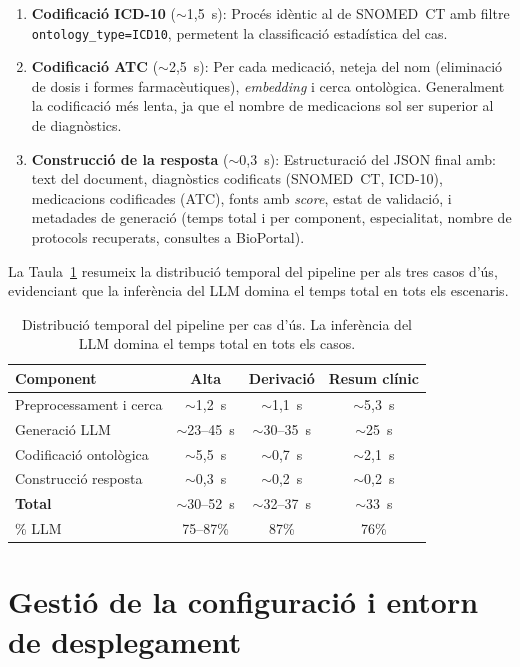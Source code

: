 \documentclass[CAT]{TFUOC}%
\begin{document}
\begin{enumerate}
    \item \textbf{Codificació ICD-10} ($\sim$1,5~s): Procés idèntic al de SNOMED~CT amb filtre \texttt{ontology\_type=ICD10}, permetent la classificació estadística del cas.

    \item \textbf{Codificació ATC} ($\sim$2,5~s): Per cada medicació, neteja del nom (eliminació de dosis i formes farmacèutiques), \textit{embedding} i cerca ontològica. Generalment la codificació més lenta, ja que el nombre de medicacions sol ser superior al de diagnòstics.

    \item \textbf{Construcció de la resposta} ($\sim$0,3~s): Estructuració del JSON final amb: text del document, diagnòstics codificats (SNOMED~CT, ICD-10), medicacions codificades (ATC), fonts amb \textit{score}, estat de validació, i metadades de generació (temps total i per component, especialitat, nombre de protocols recuperats, consultes a BioPortal).
\end{enumerate}

La Taula~\ref{tab:pipeline-timing} resumeix la distribució temporal del pipeline per als tres casos d'ús, evidenciant que la inferència del LLM domina el temps total en tots els escenaris.

\begin{table}[H]
\centering
\small
\begin{tabular}{lccc}
\hline
\textbf{Component} & \textbf{Alta} & \textbf{Derivació} & \textbf{Resum clínic} \\
\hline
Preprocessament i cerca & $\sim$1,2~s & $\sim$1,1~s & $\sim$5,3~s \\
Generació LLM & $\sim$23--45~s & $\sim$30--35~s & $\sim$25~s \\
Codificació ontològica & $\sim$5,5~s & $\sim$0,7~s & $\sim$2,1~s \\
Construcció resposta & $\sim$0,3~s & $\sim$0,2~s & $\sim$0,2~s \\
\hline
\textbf{Total} & $\sim$30--52~s & $\sim$32--37~s & $\sim$33~s \\
\% LLM & 75--87\% & 87\% & 76\% \\
\hline
\end{tabular}
\caption{Distribució temporal del pipeline per cas d'ús. La inferència del LLM domina el temps total en tots els casos.}
\label{tab:pipeline-timing}
\end{table}

\section{Gestió de la configuració i entorn de desplegament}
\end{document}

